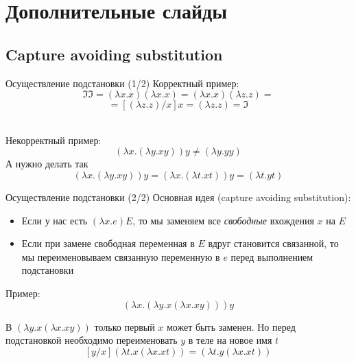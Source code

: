 \documentclass[aspectratio=169
  , xcolor={svgnames}
  , hyperref={colorlinks,citecolor=DeepPink4,linkcolor=DarkRed,urlcolor=DarkBlue}
  , russian  %
  ]{beamer}
\newcommand{\abs}[2]{\ensuremath{(\lambda #1 . #2)}}
\newcommand{\lam}[2]{\ensuremath{\abs{#1}{#2}}}
\begin{document}
\appendix

\section{Дополнительные слайды}





\subsection{Capture avoiding substitution}
\label{sec:CAS}

\begin{frame}{Осуществление подстановки (1/2)}
Корректный пример:
\[
\mathfrak{II} = \lam{x}{x}\lam{x}{x} =
\lam{x}{x}\lam{z}{z} =
\]
\[
= [\lam{z}{z}/x]x
= \lam{z}{z} = \mathfrak{I}
\]\\
\pause

\vspace{2em}
Некорректный пример:
\[
\lam{x}{\lam{y}{xy}}y \neq
\lam{y}{yy}
\]
А нужно делать так
\[
\lam{x}{\lam{y}{xy}}y =
\lam{x}{\lam{t}{xt}}y =
\lam{t}{yt}
\]

\end{frame}

\begin{frame}{Осуществление подстановки (2/2)}
Основная идея (capture avoiding substitution):
\begin{itemize}
  \item Если у нас есть
$\lam{x}{e}E$, то мы заменяем все \emph{свободные} вхождения $x$ на $E$
  \item  Если при замене свободная переменная в $E$ вдруг становится связанной, то мы переименовываем связанную переменную в $e$ перед выполнением подстановки
 \end{itemize}\vspace{1cm}

Пример:
\[
\lam{x}{\lam{y}{x\lam{x}{xy}}}y
\]

В $\lam{y}{x\lam{x}{xy}}$ только первый $x$ может быть заменен.
Но перед подстановкой необходимо переименовать $y$ в теле на новое имя $t$
\[
[y/x]\lam{t}{x\lam{x}{xt}} =\lam{t}{y\lam{x}{xt}}
\]
\end{frame}
\end{document}
